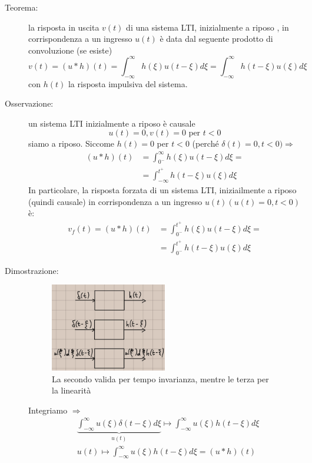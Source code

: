 \documentclass[a4paper, 12pt]{book}
\theoremstyle{plain}
\begin{document}
\begin{description}
    \item[Teorema:] la risposta in uscita $v(t)$ di una sistema LTI, inizialmente a riposo , in corrispondenza a un ingresso $u(t)$ è data dal seguente prodotto di convoluzione (se esiste) \[v(t) = (u \ast h)(t) = \int_{-\infty}^\infty h(\xi)u(t - \xi)d\xi = \int_{-\infty}^\infty h(t - \xi) u(\xi) d\xi\] con $h(t)$ la risposta impulsiva del sistema.
    \item[Osservazione:] un sistema LTI inizialmente a riposo è causale \[u(t) = 0, v(t) = 0 \textrm{ per } t < 0\] siamo a riposo. Siccome $h(t) = 0$ per $t < 0$ (perché $\delta (t) = 0, t < 0) \Rightarrow$ \[\begin{split}
        (u \ast h)(t) &= \int_{0^-}^\infty h(\xi) u(t - \xi) d\xi = \\
        &= \int_{-\infty}^{t^+} h(t- \xi) u(\xi) d\xi
    \end{split} \] In particolare, la risposta forzata di un sistema LTI, iniziailmente a riposo (quindi causale) in corrispondenza a un ingresso $u(t) (u(t) = 0, t<0)$ è: \[ \begin{split}
        v_f(t) = (u \ast h) (t) &= \int_{0^-}^{t^+} h(\xi) u(t - \xi) d\xi = \\
        &= \int_{0^-}^{t^+} h(t - \xi) u(\xi) d\xi
    \end{split}\]
    \item[Dimostrazione:] \begin{figure}
        \includegraphics[width=0.5\textwidth]{tre_sistemi.jpg}
        \caption{La secondo valida per tempo invarianza, mentre le terza per la linearità }
    \end{figure} Integriamo $\Rightarrow$ \[ \begin{split}
        &\underbrace{\int_{-\infty}^\infty u(\xi) \delta(t - \xi) d\xi}_{u(t)} \mapsto \int_{-\infty}^\infty u(\xi) h(t - \xi) d\xi \\
        &u(t) \mapsto \int_{-\infty}^\infty u(\xi) h(t - \xi) d\xi = (u \ast h)(t)

\end{split}\]
\end{description}
\end{document}
